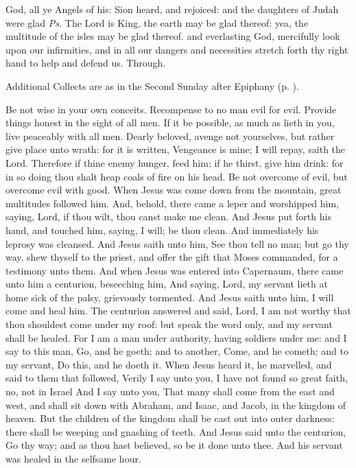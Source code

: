 \introit
{} God, all ye Angels of his: Sion heard, and rejoiced: and the daughters of Judah were glad \textit{Ps.} The Lord is King, the earth may be glad thereof: yea, the multitude of the isles may be glad thereof.
\collect
{} and everlasting God, mercifully look upon our infirmities, and in all our dangers and necessities stretch forth thy right hand to help and defend us. Through.
\begin{rubric}
    Additional Collects are as in the Second Sunday after Epiphany (p. \pageref{EpiphanyIICollect}).
\end{rubric}
 Be not wise in your own conceits. Recompense to no man evil for evil. Provide things honest in the sight of all men. If it be possible, as much as lieth in you, live peaceably with all men. Dearly beloved, avenge not yourselves, but rather give place unto wrath: for it is written, Vengeance is mine; I will repay, saith the Lord. Therefore if thine enemy hunger, feed him; if he thirst, give him drink: for in so doing thou shalt heap coals of fire on his head. Be not overcome of evil, but overcome evil with good.
 When Jesus was come down from the mountain, great multitudes followed him. And, behold, there came a leper and worshipped him, saying, Lord, if thou wilt, thou canst make me clean. And Jesus put forth his hand, and touched him, saying, I will; be thou clean. And immediately his leprosy was cleansed. And Jesus saith unto him, See thou tell no man; but go thy way, shew thyself to the priest, and offer the gift that Moses commanded, for a testimony unto them. And when Jesus was entered into Capernaum, there came unto him a centurion, beseeching him, And saying, Lord, my servant lieth at home sick of the palsy, grievously tormented. And Jesus saith unto him, I will come and heal him. The centurion answered and said, Lord, I am not worthy that thou shouldest come under my roof: but speak the word only, and my servant shall be healed. For I am a man under authority, having soldiers under me: and I say to this man, Go, and he goeth; and to another, Come, and he cometh; and to my servant, Do this, and he doeth it. When Jesus heard it, he marvelled, and said to them that followed, Verily I say unto you, I have not found so great faith, no, not in Israel And I say unto you, That many shall come from the east and west, and shall sit down with Abraham, and Isaac, and Jacob, in the kingdom of heaven. But the children of the kingdom shall be cast out into outer darkness: there shall be weeping and gnashing of teeth. And Jesus said unto the centurion, Go thy way; and as thou hast believed, so be it done unto thee. And his servant was healed in the selfsame hour.

